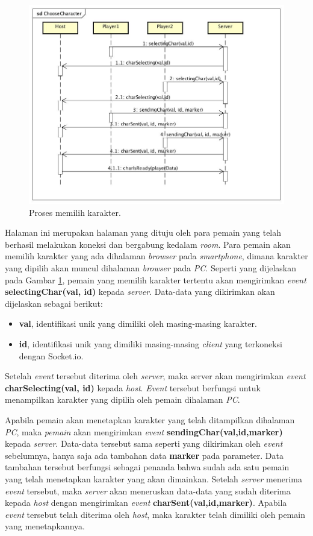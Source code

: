 \begin{figure}[H]
	\centering
	\includegraphics[scale=0.35]{Gambar/ChooseCharacter}
	\caption{Proses memilih karakter.}
	\label{fig:2_ChooseCharacter}
\end{figure}

Halaman ini merupakan halaman yang dituju oleh para pemain yang telah berhasil melakukan koneksi dan bergabung kedalam \textit{room}. Para pemain akan memilih karakter yang ada dihalaman \textit{browser} pada \textit{smartphone}, dimana karakter yang dipilih akan muncul dihalaman \textit{browser} pada \textit{PC}. Seperti yang dijelaskan pada Gambar \ref{fig:2_ChooseCharacter}, pemain yang memilih karakter tertentu akan mengirimkan \textit{event} \textbf{selectingChar(val, id)} kepada \textit{server}. Data-data yang dikirimkan akan dijelaskan sebagai berikut:
\begin{itemize}
	\item \textbf{val}, identifikasi unik yang dimiliki oleh masing-masing karakter.
	\item \textbf{id}, identifikasi unik yang dimiliki masing-masing \textit{client} yang terkoneksi dengan Socket.io.
\end{itemize}
Setelah \textit{event} tersebut diterima oleh \textit{server}, maka server akan mengirimkan \textit{event} \textbf{charSelecting(val, id)} kepada \textit{host}. \textit{Event} tersebut berfungsi untuk menampilkan karakter yang dipilih oleh pemain dihalaman \textit{PC}.

Apabila pemain akan menetapkan karakter yang telah ditampilkan dihalaman \textit{PC}, maka \textit{pemain} akan mengirimkan \textit{event} \textbf{sendingChar(val,id,marker)} kepada \textit{server}. Data-data tersebut sama seperti yang dikirimkan oleh \textit{event} sebelumnya, hanya saja ada tambahan data \textbf{marker} pada parameter. Data tambahan tersebut berfungsi sebagai penanda bahwa sudah ada satu pemain yang telah menetapkan karakter yang akan dimainkan. Setelah \textit{server} menerima \textit{event} tersebut, maka \textit{server} akan meneruskan data-data yang sudah diterima kepada \textit{host} dengan mengirimkan \textit{event} \textbf{charSent(val,id,marker)}. Apabila \textit{event} tersebut telah diterima oleh \textit{host}, maka karakter telah dimiliki oleh pemain yang menetapkannya.

